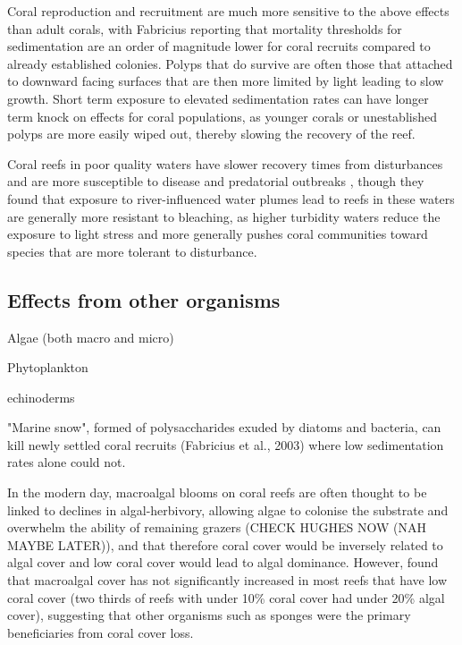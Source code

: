 \documentclass[11pt,a4paper]{article}
\begin{document}

Coral reproduction and recruitment are much more sensitive to the above effects than adult corals, with Fabricius reporting that mortality thresholds for sedimentation are an order of magnitude lower for coral recruits compared to already established colonies. Polyps that do survive are often those that attached to downward facing surfaces that are then more limited by light leading to slow growth. Short term exposure to elevated sedimentation rates can have longer term knock on effects for coral populations, as younger corals or unestablished polyps are more easily wiped out, thereby slowing the recovery of the reef.

Coral reefs in poor quality waters have slower recovery times from disturbances and are more susceptible to disease and predatorial outbreaks \citep{MacNeil2019}, though they found that exposure to river-influenced water plumes lead to reefs in these waters are generally more resistant to bleaching, as higher turbidity waters reduce the exposure to light stress and more generally pushes coral communities toward species that are more tolerant to disturbance.  




\subsection{Effects from other organisms}

Algae (both macro and micro)

Phytoplankton

echinoderms

"Marine snow", formed of polysaccharides exuded by diatoms and bacteria, can kill newly settled coral recruits (Fabricius et al., 2003) where low sedimentation rates alone could not. 

In the modern day, macroalgal blooms on coral reefs are often thought to be linked to declines in algal-herbivory, allowing algae to colonise the substrate and overwhelm the ability of remaining grazers \citep{Williams2001,Hughes1999} (CHECK HUGHES NOW (NAH MAYBE LATER)), and that therefore coral cover would be inversely related to algal cover and low coral cover would lead to algal dominance. However, \cite{Bruno2007} found that macroalgal cover has not significantly increased in most reefs that have low coral cover (two thirds of reefs with under 10\% coral cover had under 20\% algal cover), suggesting that other organisms such as sponges were the primary beneficiaries from coral cover loss.
\end{document}
